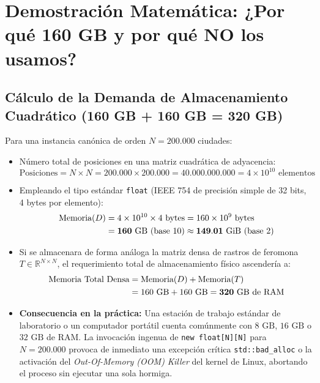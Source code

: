 \documentclass[11pt,a4paper]{article}
\begin{document}
\section{Demostración Matemática: ¿Por qué 160 GB y por qué NO los usamos?}

\subsection{Cálculo de la Demanda de Almacenamiento Cuadrático (160 GB + 160 GB = 320 GB)}
Para una instancia canónica de orden $N = 200.000$ ciudades:
\begin{itemize}
    \item Número total de posiciones en una matriz cuadrática de adyacencia:
    \begin{equation}
        \text{Posiciones} = N \times N = 200.000 \times 200.000 = 40.000.000.000 = 4 \times 10^{10} \text{ elementos}
    \end{equation}
    \item Empleando el tipo estándar \texttt{float} (IEEE 754 de precisión simple de 32 bits, 4 bytes por elemento):
    \begin{align}
        \text{Memoria}(D) &= 4 \times 10^{10} \times 4\text{ bytes} = 160 \times 10^9\text{ bytes} \notag \\
        &= \mathbf{160\text{ GB (base 10)}} \approx \mathbf{149.01\text{ GiB (base 2)}}
    \end{align}
    \item Si se almacenara de forma análoga la matriz densa de rastros de feromona $T \in \mathbb{R}^{N \times N}$, el requerimiento total de almacenamiento físico ascendería a:
    \begin{align}
        \text{Memoria Total Densa} &= \text{Memoria}(D) + \text{Memoria}(T) \notag \\
        &= 160\text{ GB} + 160\text{ GB} = \mathbf{320\text{ GB de RAM}}
    \end{align}
    \item \textbf{Consecuencia en la práctica:} Una estación de trabajo estándar de laboratorio o un computador portátil cuenta comúnmente con $8\text{ GB}$, $16\text{ GB}$ o $32\text{ GB}$ de RAM. La invocación ingenua de \texttt{new float[N][N]} para $N = 200.000$ provoca de inmediato una excepción crítica \texttt{std::bad\_alloc} o la activación del \emph{Out-Of-Memory (OOM) Killer} del kernel de Linux, abortando el proceso sin ejecutar una sola hormiga.
\end{itemize}
\end{document}
